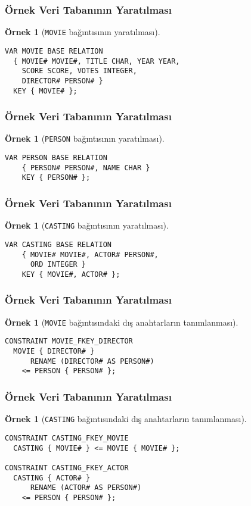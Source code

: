 \documentclass[dvipsnames]{beamer}
\theoremstyle{definition}
\theoremstyle{example}
\newtheorem{ornek}[theorem]{Örnek}
\theoremstyle{plain}
\begin{document}
\begin{frame}[fragile]
  \frametitle{Örnek Veri Tabanının Yaratılması}

  \begin{ornek}[\texttt{MOVIE} bağıntısının yaratılması]
    \begin{lstlisting}
VAR MOVIE BASE RELATION
  { MOVIE# MOVIE#, TITLE CHAR, YEAR YEAR,
    SCORE SCORE, VOTES INTEGER,
    DIRECTOR# PERSON# }
  KEY { MOVIE# };
    \end{lstlisting}
  \end{ornek}
\end{frame}

\begin{frame}[fragile]
  \frametitle{Örnek Veri Tabanının Yaratılması}

  \begin{ornek}[\texttt{PERSON} bağıntısının yaratılması]
    \begin{lstlisting}
VAR PERSON BASE RELATION
    { PERSON# PERSON#, NAME CHAR }
    KEY { PERSON# };
    \end{lstlisting}
  \end{ornek}
\end{frame}

\begin{frame}[fragile]
  \frametitle{Örnek Veri Tabanının Yaratılması}

  \begin{ornek}[\texttt{CASTING} bağıntısının yaratılması]
    \begin{lstlisting}
VAR CASTING BASE RELATION
    { MOVIE# MOVIE#, ACTOR# PERSON#,
      ORD INTEGER }
    KEY { MOVIE#, ACTOR# };
    \end{lstlisting}
  \end{ornek}
\end{frame}

\begin{frame}[fragile]
  \frametitle{Örnek Veri Tabanının Yaratılması}

  \begin{ornek}[\texttt{MOVIE} bağıntısındaki dış anahtarların tanımlanması]
    \begin{lstlisting}
CONSTRAINT MOVIE_FKEY_DIRECTOR
  MOVIE { DIRECTOR# }
      RENAME (DIRECTOR# AS PERSON#)
    <= PERSON { PERSON# };
    \end{lstlisting}
  \end{ornek}
\end{frame}

\begin{frame}[fragile]
  \frametitle{Örnek Veri Tabanının Yaratılması}

  \begin{ornek}[\texttt{CASTING} bağıntısındaki dış anahtarların tanımlanması]
    \begin{lstlisting}
CONSTRAINT CASTING_FKEY_MOVIE
  CASTING { MOVIE# } <= MOVIE { MOVIE# };

CONSTRAINT CASTING_FKEY_ACTOR
  CASTING { ACTOR# }
      RENAME (ACTOR# AS PERSON#)
    <= PERSON { PERSON# };
    \end{lstlisting}
  \end{ornek}
\end{frame}
\end{document}
